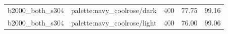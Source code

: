 \begin{longtable}{l>{\raggedright\arraybackslash}p{.42\linewidth}rrr}
b2000\_\allowbreak{}both\_\allowbreak{}s304 & %
palette:navy\_\allowbreak{}coolrose/dark & %
400 & %
77.75 & %
99.16 \\ %

b2000\_\allowbreak{}both\_\allowbreak{}s304 & %
palette:navy\_\allowbreak{}coolrose/light & %
400 & %
76.00 & %
99.06 \\ %


\end{longtable}
